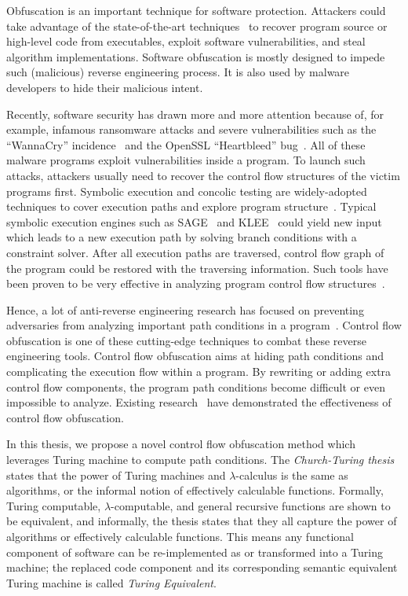 Obfuscation is an important technique for software protection.
Attackers could take advantage of the
state-of-the-art techniques~\cite{Loop,Lee,Molnar} to recover program source or high-level
code from executables, exploit software vulnerabilities, and steal algorithm
implementations. Software obfuscation is mostly designed to impede such
(malicious) reverse engineering process. It is also used by malware developers to
hide their malicious intent.

Recently, software security has drawn more and more attention because of, for example,
infamous ransomware attacks and severe vulnerabilities such as the ``WannaCry''
incidence~\cite{wannacry} and the OpenSSL ``Heartbleed'' bug~\cite{Heartbleed}. All of
these malware programs exploit vulnerabilities inside a program. To launch such attacks,
attackers usually need to recover the control flow structures of the victim
programs first. Symbolic execution and concolic testing are 
widely-adopted techniques to cover execution paths and explore program
structure~\cite{dart,exe,Sen,symbol}. Typical symbolic execution engines such as
SAGE~\cite{Sage} and KLEE~\cite{klee} could yield new input which leads to a new
execution path by solving branch conditions  with a constraint
solver. After all execution paths are traversed, control flow graph of the program could be restored
with the traversing information.
Such tools have been proven to be very effective in analyzing program
control flow structures~\cite{Cute}.

Hence, a lot of anti-reverse engineering research has focused on preventing
adversaries from analyzing important path conditions in a
program~\cite{Opaque,Sharif,Popov,Zhi, Wang:Zhi}. Control flow obfuscation is
one of these cutting-edge techniques to combat these reverse engineering tools.
Control flow obfuscation aims at hiding path conditions and complicating the
execution flow within a program. By rewriting or adding extra control flow
components, the program path conditions become difficult or even impossible to
analyze. Existing research~\cite{Ma} have demonstrated the effectiveness of
control flow obfuscation.


In this thesis, we propose a novel control flow obfuscation method which
leverages Turing machine to compute path conditions. The \textit{Church-Turing
  thesis}~\cite{Church} states that the power of Turing machines and
$\lambda$-calculus is the same as algorithms, or the informal notion of
effectively calculable functions. Formally, Turing computable,
$\lambda$-computable, and general recursive functions are shown to be
equivalent, and informally, the thesis states that they all capture the power of
algorithms or effectively calculable functions. This means any functional
component of software can be re-implemented as or transformed into a Turing
machine; the replaced code component and its corresponding semantic equivalent
Turing machine is called \textit{Turing Equivalent}.

